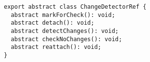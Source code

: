 \begin{verbatim}
export abstract class ChangeDetectorRef {
  abstract markForCheck(): void;
  abstract detach(): void;
  abstract detectChanges(): void;
  abstract checkNoChanges(): void;
  abstract reattach(): void;
}
\end{verbatim}
